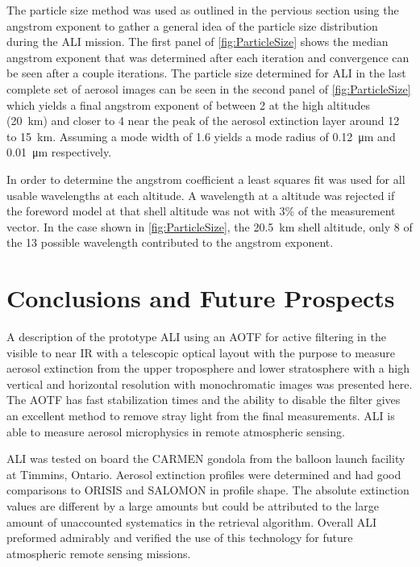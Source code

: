 \documentclass[12pt]{article}
\begin{document}
The particle size method was used as outlined in the pervious section using the angstrom exponent to gather a general idea of the particle size distribution during the ALI mission. The first panel of \autoref{fig:ParticleSize} shows the median angstrom exponent that was determined after each iteration and convergence can be seen after a couple iterations. The particle size determined for ALI in the last complete set of aerosol images can be seen in the second panel of \autoref{fig:ParticleSize} which yields a final angstrom exponent of between 2 at the high altitudes (20~km) and closer to 4 near the peak of the aerosol extinction layer around 12 to 15~km. Assuming a mode width of 1.6 yields a mode radius of 0.12~\si{\micro\metre} and 0.01~\si{\micro\metre} respectively.

In order to determine the angstrom coefficient a least squares fit was used for all usable wavelengths at each altitude. A wavelength at a altitude was rejected if the foreword model at that shell altitude was not with 3\% of the measurement vector. In the case shown in \autoref{fig:ParticleSize}, the 20.5~km shell altitude, only 8 of the 13 possible wavelength contributed to the angstrom exponent.

\section{Conclusions and Future Prospects}

A description of the prototype ALI using an AOTF for active filtering in the visible to near IR with a telescopic optical layout with the purpose to measure aerosol extinction from the upper troposphere and lower stratosphere with a high vertical and horizontal resolution with monochromatic images was presented here. The AOTF has fast stabilization times and the ability to disable the filter gives an excellent method to remove stray light from the final measurements. ALI is able to measure aerosol microphysics in remote atmospheric sensing.

ALI was tested on board the CARMEN gondola from the balloon launch facility at Timmins, Ontario. Aerosol extinction profiles were determined and had good comparisons to ORISIS and SALOMON in profile shape. The absolute extinction values are different by a large amounts but could be attributed to the large amount of unaccounted systematics in the retrieval algorithm. Overall ALI preformed admirably and verified the use of this technology for future atmospheric remote sensing missions.
\end{document}
